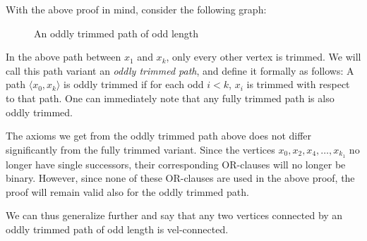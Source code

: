 With the above proof in mind, consider the following graph:\par
\begin{figure}[!h]
  \centering
  \caption{An oddly trimmed path of odd length}
  \label{fig:oddly_trimmed_path}
\end{figure}
\FloatBarrier
In the above path between $x_1$ and $x_k$, only every other vertex is trimmed.
We will call this path variant an \textit{oddly trimmed path}, and define it formally as follows:
A path $\langle x_0,x_k\rangle$ is oddly trimmed if for each odd $i < k$, $x_i$ is trimmed with respect to that path.
One can immediately note that any fully trimmed path is also oddly trimmed.

The axioms we get from the oddly trimmed path above does not differ significantly from the fully trimmed variant.
Since the vertices $x_0, x_2, x_4, \dots ,x_{k_1}$ no longer have single successors, their corresponding OR-clauses will no longer be binary.
However, since none of these OR-clauses are used in the above proof, the proof will remain valid also for the oddly trimmed path.

We can thus generalize further and say that any two vertices connected by an oddly trimmed path of odd length is vel-connected.
